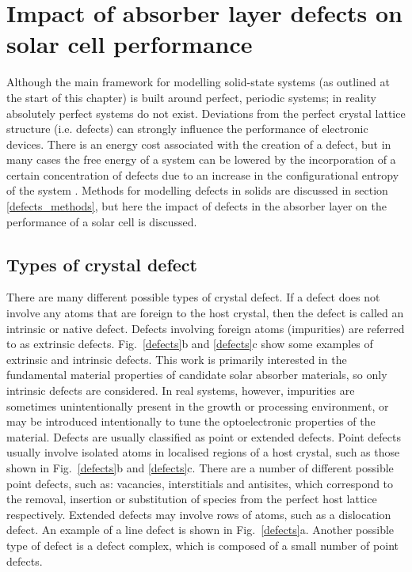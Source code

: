 \documentclass[11pt, twoside]{report}
\begin{document}
\section{Impact of absorber layer defects on solar cell performance}\label{defects_impact}
Although the main framework for modelling solid-state systems (as outlined at the start of this chapter) is built around perfect, periodic systems; in reality absolutely perfect systems do not exist. Deviations from the perfect crystal lattice structure (i.e. defects) can strongly influence the performance of electronic devices. There is an energy cost associated with the creation of a defect, but in many cases the free energy of a system can be lowered by the incorporation of a certain concentration of defects due to an increase in the configurational entropy of the system \cite{AshcroftMermin_general}. Methods for modelling defects in solids are discussed in section \ref{defects_methods}, but here the impact of defects in the absorber layer on the performance of a solar cell is discussed.

\subsection{Types of crystal defect}

There are many different possible types of crystal defect. If a defect does not involve any atoms that are foreign to the host crystal, then the defect is called an intrinsic or native defect. Defects involving foreign atoms (impurities) are referred to as extrinsic defects. Fig.~\ref{defects}b and \ref{defects}c show some examples of extrinsic and intrinsic defects. This work is primarily interested in the fundamental material properties of candidate solar absorber materials, so only intrinsic defects are considered. In real systems, however, impurities are sometimes unintentionally present in the growth or processing environment, or may be introduced intentionally to tune the optoelectronic properties of the material.
Defects are usually classified as point or extended defects. Point defects usually involve isolated atoms in localised regions of a host crystal, such as those shown in Fig.~\ref{defects}b and \ref{defects}c. There are a number of different possible point defects, such as: vacancies, interstitials and antisites, which correspond to the removal, insertion or substitution of species from the perfect host lattice respectively. Extended defects may involve rows of atoms, such as a dislocation defect. An example of a line defect is shown in Fig.~\ref{defects}a. Another possible type of defect is a defect complex, which is composed of a small number of point defects.
\end{document}
